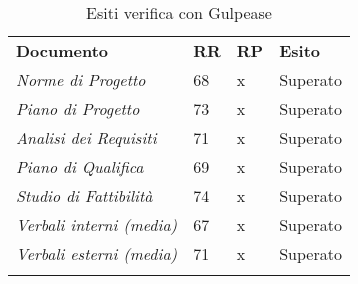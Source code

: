 \begin{center}
    \centering
    \renewcommand{\arraystretch}{1.8}
    \label{tab:IndiciGulpease}
    \begin{longtable}[!h]{p{150px} p{50px} p{50px} p{50px}}
        \caption{Esiti verifica con Gulpease}                                                  \\
        \rowcolor{logo!70}   \textbf{Documento} & \textbf{RR} & \textbf{RP}  & \textbf{Esito} \\
        \textit{Norme di Progetto}              & 68           & x            & Superato       \\
        \textit{Piano di Progetto}              & 73           & x            & Superato       \\
        \textit{Analisi dei Requisiti}          & 71           & x            & Superato       \\
        \textit{Piano di Qualifica}             & 69           & x            & Superato       \\
        \textit{Studio di Fattibilità}          & 74           & x            & Superato       \\
        \textit{Verbali interni (media)}        & 67           & x            & Superato       \\
        \textit{Verbali esterni (media)}        & 71           & x            & Superato       \\
        \rowcolor{white}
    \end{longtable}
\end{center}